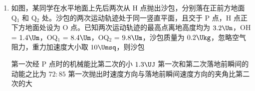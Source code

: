 \documentclass[\gkver]{gaokaozhenti}
\begin{document}
\begin{enumerate}
{$a = \frac{2mg\sin\theta + mg\sin\theta}{m} = 3g\sin\theta$

方向沿斜面向下；当 $F = -2mg\sin\theta$ 时，物块加速度大小为

$a = \frac{2mg\sin\theta - mg\sin\theta}{m} = g\sin\theta$

方向沿斜面向上，作出物块 $0 \sim 4t_{0}$ 内的 $v-t$ 图像


A．根据图像可知 $0 \sim 4t_{0}$，物体一直沿斜面向下运动，故 A 正确；

B．根据图像可知 $0 \sim 4t_{0}$，物块的末速度不等于 0，根据动量定理 $I_{\text{合}} = \Delta p \neq 0$。故 B 错误；

C．根据图像可知 $t_{0}$ 时物块速度大于 $2t_{0}$ 时物块的速度，故 $t_{0}$ 时动量不是 $2t_{0}$ 时的一半，故 C 错误；

D．$v-t$ 图像与横轴围成的面积表示位移，故由图像可知 $2t_{0} \sim 3t_{0}$ 过程物体的位移小于 $3t_{0} \sim 4t_{0}$ 的位移，故 D 正确。

故选 AD。
}

\item
如图，某同学在水平地面上先后两次从 H 点抛出沙包，分别落在正前方地面 Q$_{1}$ 和 Q$_{2}$ 处。沙包的两次运动轨迹处于同一竖直平面，且交于 P 点，H 点正下方地面处设为 O 点。已知两次运动轨迹的最高点离地高度均为 $3.2 \Um$，OH = $1.4 \Um$，OQ$_{1}$ = $8.4 \Um$，OQ$_{2}$ = $9.8 \Um$，沙包质量为 $0.2 \Ukg$，忽略空气阻力，重力加速度大小取 $10 \Umsq$，则沙包


{第一次经 P 点时的机械能比第二次的小 $1.3 \UJ$}
{第一次和第二次落地前瞬间的动能之比为 $72:85$}
{第一次抛出时速度方向与落地前瞬间速度方向的夹角比第二次的大}

\end{enumerate}
\end{document}

